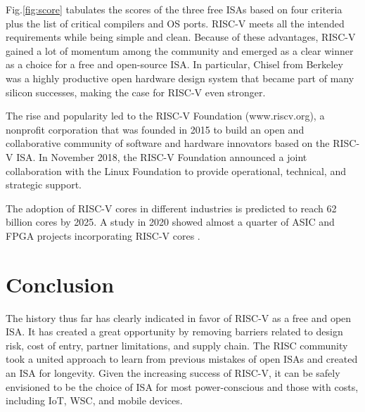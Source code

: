 \documentclass[journal]{IEEEtran}
\begin{document}
Fig.\ref{fig:score} tabulates the scores of the three free ISAs based on four criteria plus the list of critical compilers and OS ports. RISC-V meets all the intended requirements while being simple and clean. Because of these advantages, RISC-V gained a lot of momentum among the community and emerged as a clear winner as a choice for a free and open-source ISA. In particular, Chisel \cite{bachrach_chisel_2012} from Berkeley was a highly productive open hardware design system that became part of many silicon successes, making the case for RISC-V even stronger. 

The rise and popularity led to the RISC-V Foundation (www.riscv.org), a nonprofit corporation that was founded in 2015 to build an open and collaborative community of software and hardware innovators based on the RISC-V ISA. In November 2018, the RISC-V Foundation announced a joint collaboration with the Linux Foundation to provide operational, technical, and strategic support.

The adoption of RISC-V cores in different industries is predicted to reach 62 billion cores by 2025. A study in 2020 showed almost a quarter of ASIC and FPGA projects incorporating RISC-V cores \cite{redmond_risc-v_2021}.

\section{Conclusion}
The history thus far has clearly indicated in favor of RISC-V as a free and open ISA. It has created a great opportunity by removing barriers related to design risk, cost of entry, partner limitations, and supply chain. The RISC community took a united approach to learn from previous mistakes of open ISAs and created an ISA for longevity. Given the increasing success of RISC-V, it can be safely envisioned to be the choice of ISA for most power-conscious and those with costs, including IoT, WSC, and mobile devices.  









\end{document}
